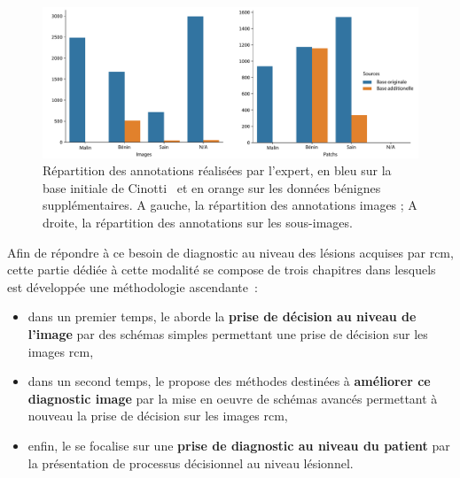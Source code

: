 \begin{figure}[H]
    \begin{center}
        \includegraphics[width=\linewidth]{contents/ii_preamble_microscopy/resources/scheme_rcm_statistics.pdf}
        \caption{Répartition des annotations réalisées par l'expert, en bleu sur la base initiale de Cinotti~\cite{Cinotti2018} et en orange sur les données bénignes supplémentaires. A gauche, la répartition des annotations images ; A droite, la répartition des annotations sur les sous-images.}
        \label{fig:scheme_rcm_statistics}
    \end{center} 
\end{figure}\par

Afin de répondre à ce besoin de diagnostic au niveau des lésions acquises par \gls{rcm}, cette partie dédiée à cette modalité se compose de trois chapitres dans lesquels est développée une méthodologie ascendante~:
\begin{itemize}
    \item dans un premier temps, le  aborde la \textbf{prise de décision au niveau de l'image} par des schémas simples permettant une prise de décision sur les images \gls{rcm},
    \item dans un second temps, le  propose des méthodes destinées à \textbf{améliorer ce diagnostic image} par la mise en oeuvre de schémas avancés permettant à nouveau la prise de décision sur les images \gls{rcm},
    \item enfin, le  se focalise sur une \textbf{prise de diagnostic au niveau du patient} par la présentation de processus décisionnel au niveau lésionnel.
\end{itemize}\par
\newpage